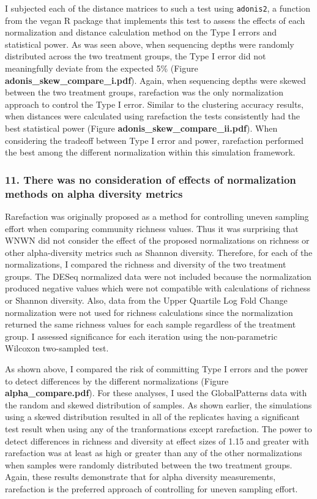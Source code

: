 \documentclass[
]{article}
\begin{document}
I subjected each of the distance matrices to such a test using
\texttt{adonis2}, a function from the vegan R package that implements
this test to assess the effects of each normalization and distance
calculation method on the Type I errors and statistical power. As was
seen above, when sequencing depths were randomly distributed across the
two treatment groups, the Type I error did not meaningfully deviate from
the expected 5\% (Figure \textbf{adonis\_skew\_compare\_i.pdf}). Again,
when sequencing depths were skewed between the two treatment groups,
rarefaction was the only normalization approach to control the Type I
error. Similar to the clustering accuracy results, when distances were
calculated using rarefaction the tests consistently had the best
statistical power (Figure \textbf{adonis\_skew\_compare\_ii.pdf}). When
considering the tradeoff between Type I error and power, rarefaction
performed the best among the different normalization within this
simulation framework.

\hypertarget{there-was-no-consideration-of-effects-of-normalization-methods-on-alpha-diversity-metrics}{%
\subsubsection{11. There was no consideration of effects of
normalization methods on alpha diversity
metrics}\label{there-was-no-consideration-of-effects-of-normalization-methods-on-alpha-diversity-metrics}}

Rarefaction was originally proposed as a method for controlling uneven
sampling effort when comparing community richness values. Thus it was
surprising that WNWN did not consider the effect of the proposed
normalizations on richness or other alpha-diversity metrics such as
Shannon diversity. Therefore, for each of the normalizations, I compared
the richness and diversity of the two treatment groups. The DESeq
normalized data were not included because the normalization produced
negative values which were not compatible with calculations of richness
or Shannon diversity. Also, data from the Upper Quartile Log Fold Change
normalization were not used for richness calculations since the
normalization returned the same richness values for each sample
regardless of the treatment group. I assessed significance for each
iteration using the non-parametric Wilcoxon two-sampled test.

As shown above, I compared the risk of committing Type I errors and the
power to detect differences by the different normalizations (Figure
\textbf{alpha\_compare.pdf}). For these analyses, I used the
GlobalPatterns data with the random and skewed distribution of samples.
As shown earlier, the simulations using a skewed distribution resulted
in all of the replicates having a significant test result when using any
of the tranformations except rarefaction. The power to detect
differences in richness and diversity at effect sizes of 1.15 and
greater with rarefaction was at least as high or greater than any of the
other normalizations when samples were randomly distributed between the
two treatment groups. Again, these results demonstrate that for alpha
diversity measurements, rarefaction is the preferred approach of
controlling for uneven sampling effort.
\end{document}
